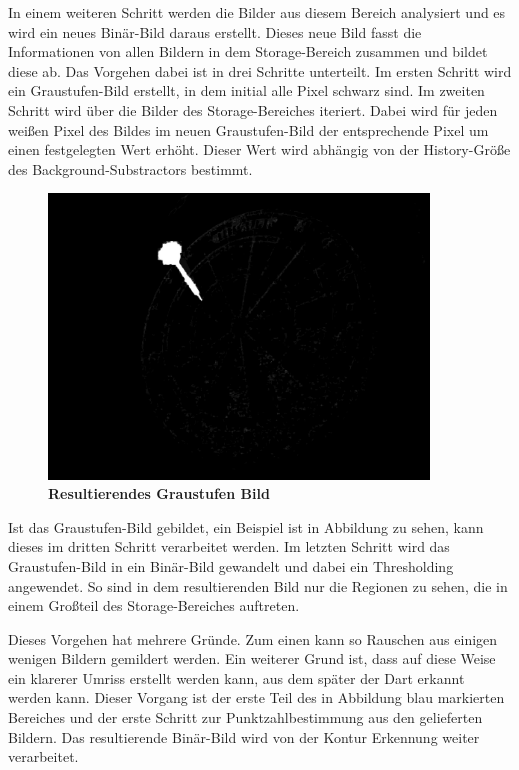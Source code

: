 In einem weiteren Schritt werden die Bilder aus diesem Bereich analysiert und es wird ein neues Binär-Bild daraus erstellt. Dieses neue Bild fasst die Informationen von allen Bildern in dem Storage-Bereich zusammen und bildet diese ab.
Das Vorgehen dabei ist in drei Schritte unterteilt.
Im ersten Schritt wird ein Graustufen-Bild erstellt, in dem initial alle Pixel schwarz sind. 
Im zweiten Schritt wird über die Bilder des Storage-Bereiches iteriert. Dabei wird für jeden weißen Pixel des Bildes im neuen Graustufen-Bild der entsprechende Pixel um einen festgelegten Wert erhöht. Dieser Wert wird abhängig von der History-Größe des Background-Substractors bestimmt.
\begin{figure}[ht]
\centering
\includegraphics[width=0.9\textwidth]{media/blobimg}
\caption{\textbf{Resultierendes Graustufen Bild}}
\label{Fig:greyimg}
\end{figure}
Ist das Graustufen-Bild gebildet, ein Beispiel ist in Abbildung  zu sehen, kann dieses im dritten Schritt verarbeitet werden. 
Im letzten Schritt wird das Graustufen-Bild in ein Binär-Bild gewandelt und dabei ein Thresholding angewendet. So sind in dem resultierenden Bild nur die Regionen zu sehen, die in einem Großteil des Storage-Bereiches auftreten. 

Dieses Vorgehen hat mehrere Gründe. 
Zum einen kann so Rauschen aus einigen wenigen Bildern gemildert werden. 
Ein weiterer Grund ist, dass auf diese Weise ein klarerer Umriss erstellt werden kann, aus dem später der Dart erkannt werden kann. 
Dieser Vorgang ist der erste Teil des in Abbildung  blau markierten Bereiches und der erste Schritt zur Punktzahlbestimmung aus den gelieferten Bildern. Das resultierende Binär-Bild wird von der Kontur Erkennung weiter verarbeitet.

